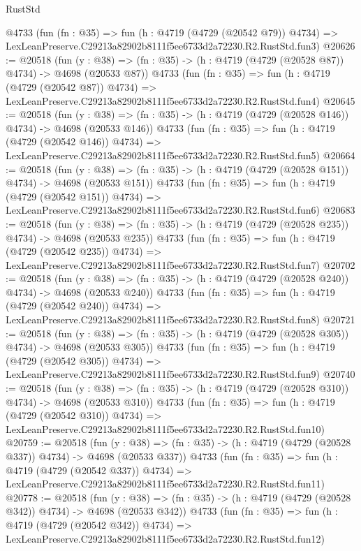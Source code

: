 \begin{lexlean}{RustStd}
\begin{coremodule}
    @4733
    (fun (fn : @35) =>
    fun (h : @4719 (@4729 (@20542 @79)) @4734) =>
    LexLeanPreserve.C29213a82902b8111f5ee6733d2a72230.R2.RustStd.fun3)
@20626 := @20518
    (fun (y : @38) => (fn : @35) -> (h : @4719 (@4729 (@20528 @87)) @4734) -> @4698 (@20533 @87))
    @4733
    (fun (fn : @35) =>
    fun (h : @4719 (@4729 (@20542 @87)) @4734) =>
    LexLeanPreserve.C29213a82902b8111f5ee6733d2a72230.R2.RustStd.fun4)
@20645 := @20518
    (fun (y : @38) => (fn : @35) -> (h : @4719 (@4729 (@20528 @146)) @4734) -> @4698 (@20533 @146))
    @4733
    (fun (fn : @35) =>
    fun (h : @4719 (@4729 (@20542 @146)) @4734) =>
    LexLeanPreserve.C29213a82902b8111f5ee6733d2a72230.R2.RustStd.fun5)
@20664 := @20518
    (fun (y : @38) => (fn : @35) -> (h : @4719 (@4729 (@20528 @151)) @4734) -> @4698 (@20533 @151))
    @4733
    (fun (fn : @35) =>
    fun (h : @4719 (@4729 (@20542 @151)) @4734) =>
    LexLeanPreserve.C29213a82902b8111f5ee6733d2a72230.R2.RustStd.fun6)
@20683 := @20518
    (fun (y : @38) => (fn : @35) -> (h : @4719 (@4729 (@20528 @235)) @4734) -> @4698 (@20533 @235))
    @4733
    (fun (fn : @35) =>
    fun (h : @4719 (@4729 (@20542 @235)) @4734) =>
    LexLeanPreserve.C29213a82902b8111f5ee6733d2a72230.R2.RustStd.fun7)
@20702 := @20518
    (fun (y : @38) => (fn : @35) -> (h : @4719 (@4729 (@20528 @240)) @4734) -> @4698 (@20533 @240))
    @4733
    (fun (fn : @35) =>
    fun (h : @4719 (@4729 (@20542 @240)) @4734) =>
    LexLeanPreserve.C29213a82902b8111f5ee6733d2a72230.R2.RustStd.fun8)
@20721 := @20518
    (fun (y : @38) => (fn : @35) -> (h : @4719 (@4729 (@20528 @305)) @4734) -> @4698 (@20533 @305))
    @4733
    (fun (fn : @35) =>
    fun (h : @4719 (@4729 (@20542 @305)) @4734) =>
    LexLeanPreserve.C29213a82902b8111f5ee6733d2a72230.R2.RustStd.fun9)
@20740 := @20518
    (fun (y : @38) => (fn : @35) -> (h : @4719 (@4729 (@20528 @310)) @4734) -> @4698 (@20533 @310))
    @4733
    (fun (fn : @35) =>
    fun (h : @4719 (@4729 (@20542 @310)) @4734) =>
    LexLeanPreserve.C29213a82902b8111f5ee6733d2a72230.R2.RustStd.fun10)
@20759 := @20518
    (fun (y : @38) => (fn : @35) -> (h : @4719 (@4729 (@20528 @337)) @4734) -> @4698 (@20533 @337))
    @4733
    (fun (fn : @35) =>
    fun (h : @4719 (@4729 (@20542 @337)) @4734) =>
    LexLeanPreserve.C29213a82902b8111f5ee6733d2a72230.R2.RustStd.fun11)
@20778 := @20518
    (fun (y : @38) => (fn : @35) -> (h : @4719 (@4729 (@20528 @342)) @4734) -> @4698 (@20533 @342))
    @4733
    (fun (fn : @35) =>
    fun (h : @4719 (@4729 (@20542 @342)) @4734) =>
    LexLeanPreserve.C29213a82902b8111f5ee6733d2a72230.R2.RustStd.fun12)

\end{coremodule}
\end{lexlean}
